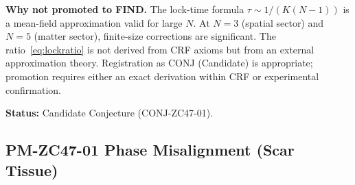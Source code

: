 \documentclass[12pt, a4paper]{article}
\begin{document}
\begin{openqbox}[title={CONJ-ZC47-01: Lock-Time Ratio Candidate
  (Not Promoted to FIND)}]
\textbf{Why not promoted to FIND.}
The lock-time formula $\tau \sim 1/(K(N-1))$ is a mean-field
approximation valid for large $N$.
At $N = 3$ (spatial sector) and $N = 5$ (matter sector), finite-size
corrections are significant.
The ratio~\eqref{eq:lockratio} is not derived from CRF axioms but
from an external approximation theory.
Registration as CONJ (Candidate) is appropriate; promotion requires
either an exact derivation within CRF or experimental confirmation.

\textbf{Status:} Candidate Conjecture (CONJ-ZC47-01).
\end{openqbox}

\subsection{PM-ZC47-01 \quad Phase Misalignment (Scar Tissue)}
\label{sec:pm01}

\end{document}
